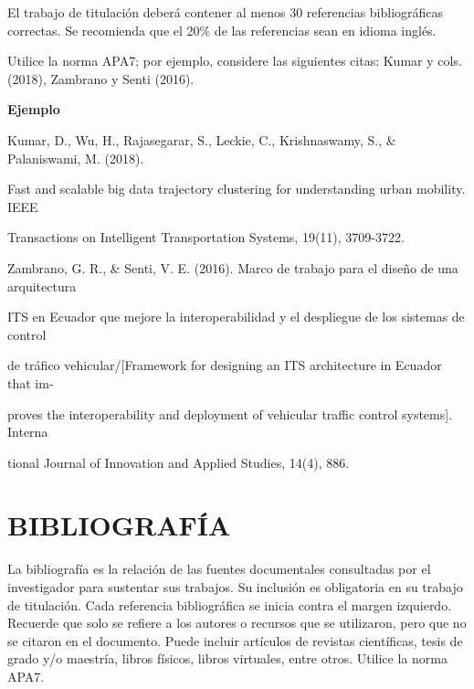 \documentclass[12pt, a4paper, nofontenc, numbers=endperiod]{apa7}
\begin{document}
{\setlength{\parindent}{1.27cm}El trabajo de titulación deberá contener al menos 30 referencias bibliográficas correctas. Se recomienda que el 20\% de las referencias sean en idioma inglés.

\setlength{\parindent}{1.27cm}Utilice la norma APA7; por ejemplo, considere las siguientes citas:  Kumar y cols. (2018), Zambrano y Senti (2016). 


\begin{center}
	\textbf{Ejemplo}
\end{center}	

% 
%

\setlength{\parindent}{0cm}Kumar, D., Wu, H., Rajasegarar, S., Leckie, C., Krishnaswamy, S., \& Palaniswami, M. (2018).

\setlength{\parindent}{1.10cm}Fast and scalable big data trajectory clustering for understanding urban mobility. IEEE 

\setlength{\parindent}{1.10cm}Transactions on Intelligent Transportation Systems, 19(11), 3709-3722.

\setlength{\parindent}{0cm}Zambrano, G. R., \& Senti, V. E. (2016). Marco de trabajo para el diseño de una arquitectura  

\setlength{\parindent}{1.10cm}ITS en Ecuador que mejore la interoperabilidad y el despliegue de los sistemas de control 

\setlength{\parindent}{1.10cm}de tráfico vehicular/[Framework for designing an ITS architecture in Ecuador that im- 

\setlength{\parindent}{1.10cm}proves the interoperability and deployment of vehicular traffic control systems]. Interna

\setlength{\parindent}{1.10cm}tional Journal of Innovation and Applied Studies, 14(4), 886.



\newpage
\section*{\large \centering BIBLIOGRAFÍA}

La bibliografía es la relación de las fuentes documentales consultadas por el investigador para sustentar sus trabajos. Su inclusión es obligatoria en su trabajo de titulación. Cada referencia bibliográfica se inicia contra el margen izquierdo. Recuerde que solo se refiere a los autores o recursos que se utilizaron, pero que no se citaron en el documento. Puede incluir artículos de revistas científicas, tesis de grado y/o maestría, libros físicos, libros virtuales, entre otros. Utilice la norma APA7.


}
\end{document}
